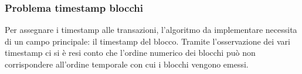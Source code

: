 \subsubsection{Problema timestamp blocchi}
Per assegnare i timestamp alle transazioni, l'algoritmo da implementare necessita di un campo principale: il timestamp del blocco. Tramite l'osservazione dei vari timestamp ci si è resi conto che l'ordine numerico dei blocchi può non corrispondere all'ordine temporale con cui i blocchi vengono emessi. 


